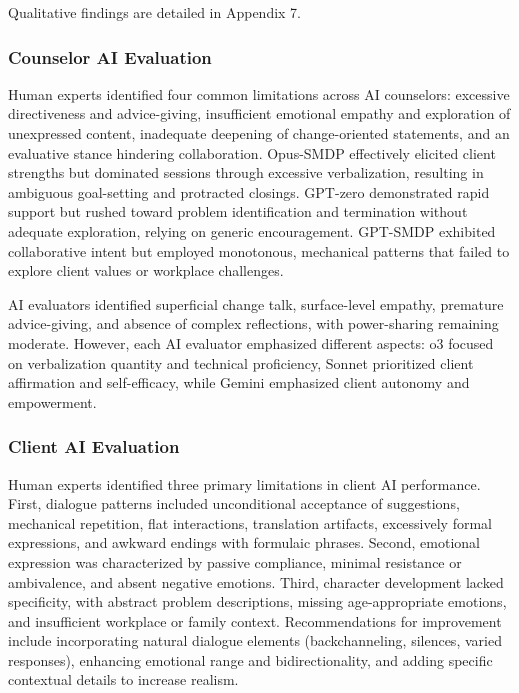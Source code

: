 \documentclass{wiley-article}
\begin{document}
Qualitative findings are detailed in Appendix 7.

\subsubsection*{Counselor AI Evaluation}

Human experts identified four common limitations across AI counselors: excessive directiveness and advice-giving, insufficient emotional empathy and exploration of unexpressed content, inadequate deepening of change-oriented statements, and an evaluative stance hindering collaboration. Opus-SMDP effectively elicited client strengths but dominated sessions through excessive verbalization, resulting in ambiguous goal-setting and protracted closings. GPT-zero demonstrated rapid support but rushed toward problem identification and termination without adequate exploration, relying on generic encouragement. GPT-SMDP exhibited collaborative intent but employed monotonous, mechanical patterns that failed to explore client values or workplace challenges.

AI evaluators identified superficial change talk, surface-level empathy, premature advice-giving, and absence of complex reflections, with power-sharing remaining moderate. However, each AI evaluator emphasized different aspects: o3 focused on verbalization quantity and technical proficiency, Sonnet prioritized client affirmation and self-efficacy, while Gemini emphasized client autonomy and empowerment.

\subsubsection*{Client AI Evaluation}

Human experts identified three primary limitations in client AI performance. First, dialogue patterns included unconditional acceptance of suggestions, mechanical repetition, flat interactions, translation artifacts, excessively formal expressions, and awkward endings with formulaic phrases. Second, emotional expression was characterized by passive compliance, minimal resistance or ambivalence, and absent negative emotions. Third, character development lacked specificity, with abstract problem descriptions, missing age-appropriate emotions, and insufficient workplace or family context. Recommendations for improvement include incorporating natural dialogue elements (backchanneling, silences, varied responses), enhancing emotional range and bidirectionality, and adding specific contextual details to increase realism.
\end{document}
